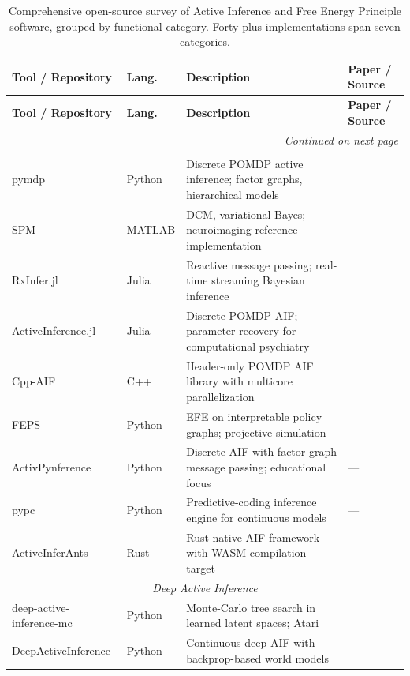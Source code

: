 \documentclass[
  english,
]{article}
\begin{document}
{{{{{{{{{{{{{{{{\begin{center}
\small
\begin{longtable}{p{3.2cm} p{1.6cm} p{6.4cm} p{2.5cm}}
\caption{Comprehensive open-source survey of Active Inference and Free Energy Principle software, grouped by functional category. Forty-plus implementations span seven categories.}
\label{tab:tool_survey} \\
\toprule
\textbf{Tool / Repository} & \textbf{Lang.} & \textbf{Description} & \textbf{Paper / Source} \\
\midrule
\endfirsthead
\toprule
\textbf{Tool / Repository} & \textbf{Lang.} & \textbf{Description} & \textbf{Paper / Source} \\
\midrule
\endhead
\midrule
\multicolumn{4}{r}{\textit{Continued on next page}} \\
\endfoot
\bottomrule
\endlastfoot
\multicolumn{4}{c}{\textit{General-Purpose Frameworks}} \\
\midrule
pymdp & Python & Discrete POMDP active inference; factor graphs, hierarchical models & \cite{heins2022pymdp} \\
SPM & MATLAB & DCM, variational Bayes; neuroimaging reference implementation & \cite{friston2017active} \\
RxInfer.jl & Julia & Reactive message passing; real-time streaming Bayesian inference & \cite{rxinfer2025} \\
ActiveInference.jl & Julia & Discrete POMDP AIF; parameter recovery for computational psychiatry & \cite{ActiveInferencejl} \\
Cpp-AIF & C++ & Header-only POMDP AIF library with multicore parallelization & \cite{gregoretti2023cppaif} \\
FEPS & Python & EFE on interpretable policy graphs; projective simulation & \cite{pazem2024feps} \\
ActivPynference & Python & Discrete AIF with factor-graph message passing; educational focus & --- \\
pypc & Python & Predictive-coding inference engine for continuous models & --- \\
ActiveInferAnts & Rust & Rust-native AIF framework with WASM compilation target & --- \\
\midrule
\multicolumn{4}{c}{\textit{Deep Active Inference}} \\
\midrule
deep-active-inference-mc & Python & Monte-Carlo tree search in learned latent spaces; Atari & \cite{fountas2020deep} \\
DeepActiveInference & Python & Continuous deep AIF with backprop-based world models & \cite{millidge2020deep} \\

\end{longtable}
\end{center}}}}}}}}}}}}}}}}}
\end{document}
